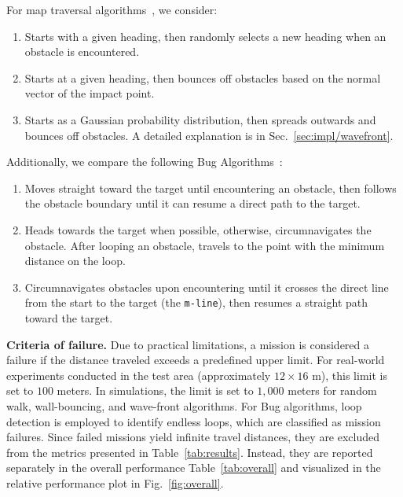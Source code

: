 \vspace{1mm}
\noindent
For map traversal algorithms~\cite{pang2019randoomwalk}, we consider:
\begin{enumerate}[label={$\arabic*$.},nolistsep,leftmargin=*]
\item  {} Starts with a given heading, then randomly selects a new heading when an obstacle is encountered.
\item  {} Starts at a given heading, then bounces off obstacles based on the normal vector of the impact point.
\item  {} Starts as a Gaussian probability distribution, then spreads outwards and bounces off obstacles. A detailed explanation is in Sec.~\ref{sec:impl/wavefront}.
\end{enumerate}

\vspace{1mm}
\noindent
Additionally, we compare the following Bug Algorithms~\cite{lumelsky1986dynamic,lumelsky1987path}:
\begin{enumerate}[label={$\arabic*$.},nolistsep,leftmargin=*]
\item  {} Moves straight toward the target until encountering an obstacle, then follows the obstacle boundary until it can resume a direct path to the target.
\item  {} Heads towards the target when possible, otherwise, circumnavigates the obstacle. After looping an obstacle, travels to the point with the minimum distance on the loop.
\item  {} Circumnavigates obstacles upon encountering until it crosses the direct line from the start to the target (the {\tt m-line}), then resumes a straight path toward the target.
\end{enumerate}


\vspace{1mm}
\noindent
\textbf{Criteria of failure.} Due to practical limitations, a mission is considered a failure if the distance traveled exceeds a predefined upper limit. For real-world experiments conducted in the test area (approximately $12 \times 16$ m), this limit is set to $100$ meters. In simulations, the limit is set to $1,000$ meters for random walk, wall-bouncing, and wave-front algorithms. For Bug algorithms, loop detection is employed to identify endless loops, which are classified as mission failures. Since failed missions yield infinite travel distances, they are excluded from the metrics presented in Table~\ref{tab:results}. Instead, they are reported separately in the overall performance Table~\ref{tab:overall} and visualized in the relative performance plot in Fig.~\ref{fig:overall}.

